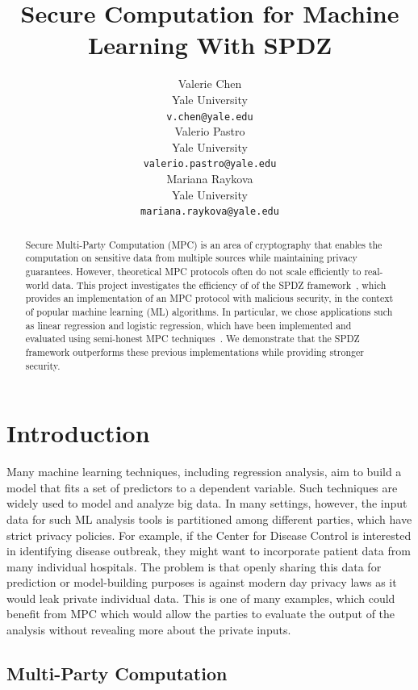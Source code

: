 \documentclass{article}
\title{Secure Computation for Machine Learning With SPDZ}
\author{
  Valerie Chen\\
  Yale University\\
  \texttt{v.chen@yale.edu} \\
  \And
  Valerio Pastro\\
  Yale University\\
  \texttt{valerio.pastro@yale.edu}\\
  \And
  Mariana Raykova \\
  Yale University \\
  \texttt{mariana.raykova@yale.edu} \\
}
\begin{document}
\maketitle

\begin{abstract}
Secure Multi-Party Computation (MPC) is an area of cryptography that enables the computation on sensitive data from multiple sources while maintaining privacy guarantees.
However, theoretical MPC protocols often do not scale efficiently to real-world data. This project investigates the efficiency of of the SPDZ framework~\cite{SPDZ12}, which provides an implementation
of an MPC protocol with malicious security, in the context of popular machine learning (ML) algorithms. In particular, we chose applications such as linear regression and logistic regression,
which have been implemented and evaluated using semi-honest MPC techniques~\cite{GSB0DZE17, MZ17}. We demonstrate that the SPDZ framework outperforms these previous implementations while providing stronger security.
\end{abstract}


\section{Introduction}

Many machine learning techniques, including regression analysis, aim to build a model that fits a set of predictors to a dependent variable. Such techniques are widely used to model and analyze big data.
In many settings, however, the input data for such ML analysis tools is partitioned among different parties, which have strict privacy policies. For example, if the Center for Disease Control is interested in identifying disease outbreak, they might want to incorporate patient data from many individual hospitals. The problem is that openly sharing this data for prediction or model-building purposes is against modern day privacy laws as it would leak private individual data. This is one of many examples, which could benefit from MPC which would allow the parties to evaluate the output of the analysis without revealing more about the private inputs.

\subsection{Multi-Party Computation}
\end{document}
